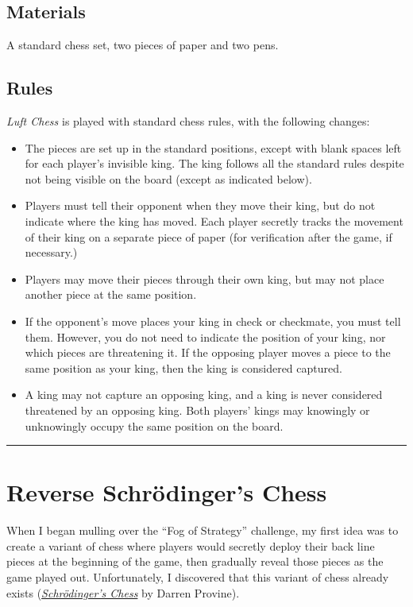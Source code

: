 \documentclass{article}
\begin{document}
\subsection{Materials}
A standard chess set, two pieces of paper and two pens.

\subsection{Rules}
\textit{Luft Chess} is played with standard chess rules, with the following changes:

\begin{itemize}
\item The pieces are set up in the standard positions, except with blank spaces left for each player's invisible king. The king follows all the standard rules despite not being visible on the board (except as indicated below).
\item Players must tell their opponent when they move their king, but do not indicate where the king has moved. Each player secretly tracks the movement of their king on a separate piece of paper (for verification after the game, if necessary.)
\item Players may move their pieces through their own king, but may not place another piece at the same position.
\item If the opponent's move places your king in check or checkmate, you must tell them. However, you do not need to indicate the position of your king, nor which pieces are threatening it. If the opposing player moves a piece to the same position as your king, then the king is considered captured.
\item A king may not capture an opposing king, and a king is never considered threatened by an opposing king. Both players' kings may knowingly or unknowingly occupy the same position on the board.
\end{itemize}

\noindent\hfil\rule{0.5\textwidth}{.4pt}\hfil

\section{Reverse Schr\"{o}dinger's Chess}
When I began mulling over the ``Fog of Strategy'' challenge, my first idea was to create a variant of chess where players would secretly deploy their back line pieces at the beginning of the game, then gradually reveal those pieces as the game played out. Unfortunately, I discovered that this variant of chess already exists (\textit{\href{http://elvis.rowan.edu/~kilroy/other/?chess}{Schr\"{o}dinger's Chess}} by Darren Provine).
\end{document}
